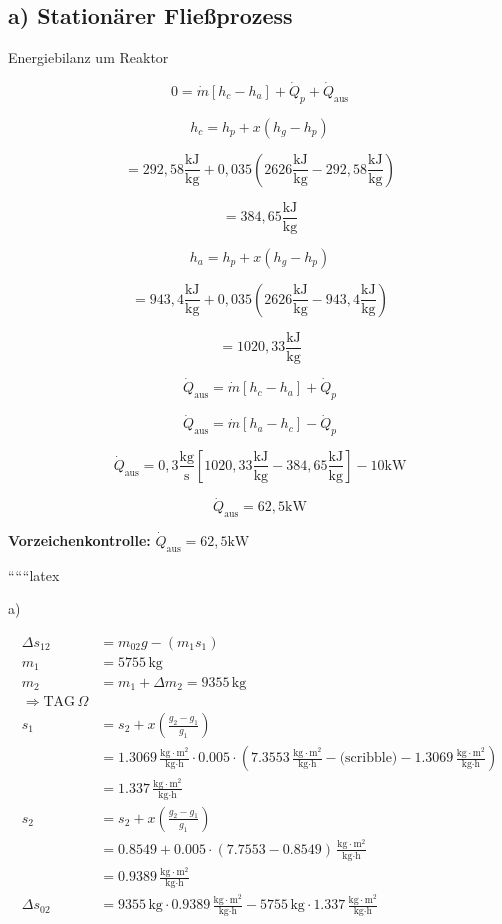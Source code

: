 \subsection*{a) Stationärer Fließprozess}

Energiebilanz um Reaktor

\[
0 = \dot{m} \left[ h_c - h_a \right] + \dot{Q}_p + \dot{Q}_{\text{aus}}
\]

\[
h_c = h_{p} + x \left( h_{g} - h_{p} \right)
\]

\[
= 292,58 \frac{\text{kJ}}{\text{kg}} + 0,035 \left( 2626 \frac{\text{kJ}}{\text{kg}} - 292,58 \frac{\text{kJ}}{\text{kg}} \right)
\]

\[
= 384,65 \frac{\text{kJ}}{\text{kg}}
\]

\[
h_a = h_{p} + x \left( h_{g} - h_{p} \right)
\]

\[
= 943,4 \frac{\text{kJ}}{\text{kg}} + 0,035 \left( 2626 \frac{\text{kJ}}{\text{kg}} - 943,4 \frac{\text{kJ}}{\text{kg}} \right)
\]

\[
= 1020,33 \frac{\text{kJ}}{\text{kg}}
\]

\[
\dot{Q}_{\text{aus}} = \dot{m} \left[ h_c - h_a \right] + \dot{Q}_p
\]

\[
\dot{Q}_{\text{aus}} = \dot{m} \left[ h_a - h_c \right] - \dot{Q}_p
\]

\[
\dot{Q}_{\text{aus}} = 0,3 \frac{\text{kg}}{\text{s}} \left[ 1020,33 \frac{\text{kJ}}{\text{kg}} - 384,65 \frac{\text{kJ}}{\text{kg}} \right] - 10 \text{kW}
\]

\[
\dot{Q}_{\text{aus}} = 62,5 \text{kW}
\]

\textbf{Vorzeichenkontrolle:} \underline{$\dot{Q}_{\text{aus}} = 62,5 \text{kW}$}

``````latex

a)

\begin{align*}
\Delta s_{12} &= m_{02}g - (m_1 s_1) \\
m_1 &= 5755 \, \text{kg} \\
m_2 &= m_1 + \Delta m_2 = 9355 \, \text{kg} \\
\Rightarrow \text{TAG} \, \Omega \\
s_1 &= s_2 + x \left( \frac{g_2 - g_1}{g_1} \right) \\
&= 1.3069 \, \frac{\text{kg} \cdot \text{m}^2}{\text{kg} \cdot \text{h}} \cdot 0.005 \cdot (7.3553 \, \frac{\text{kg} \cdot \text{m}^2}{\text{kg} \cdot \text{h}} - \text{(scribble)} - 1.3069 \, \frac{\text{kg} \cdot \text{m}^2}{\text{kg} \cdot \text{h}}) \\
&= 1.337 \, \frac{\text{kg} \cdot \text{m}^2}{\text{kg} \cdot \text{h}} \\
s_2 &= s_2 + x \left( \frac{g_2 - g_1}{g_1} \right) \\
&= 0.8549 + 0.005 \cdot (7.7553 - 0.8549) \, \frac{\text{kg} \cdot \text{m}^2}{\text{kg} \cdot \text{h}} \\
&= 0.9389 \, \frac{\text{kg} \cdot \text{m}^2}{\text{kg} \cdot \text{h}} \\
\Delta s_{02} &= 9355 \, \text{kg} \cdot 0.9389 \, \frac{\text{kg} \cdot \text{m}^2}{\text{kg} \cdot \text{h}} - 5755 \, \text{kg} \cdot 1.337 \, \frac{\text{kg} \cdot \text{m}^2}{\text{kg} \cdot \text{h}}
\end{align*}